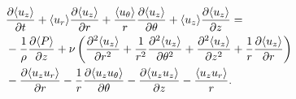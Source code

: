 \documentclass[oneside,a4paper,11pt]{report}
\begin{document}
\begin{align}
&\frac{\partial \langle u_z \rangle}{\partial t} + \langle u_r \rangle \frac{\partial \langle u_z \rangle}{\partial r} + \frac{\langle u_\theta \rangle}{r} \frac{\partial \langle u_z \rangle}{\partial \theta} + \langle u_z \rangle \frac{\partial \langle u_z \rangle}{\partial z} =  \nonumber \\
&-\frac{1}{\rho} \frac{\partial \langle P \rangle}{\partial z} + \nu \left ( \frac{\partial^2 \langle u_z \rangle}{\partial r^2} + \frac{1}{r^2} \frac{\partial^2 \langle u_z \rangle}{\partial \theta^2} + \frac{\partial^2 \langle u_z \rangle}{\partial z^2} + \frac{1}{r} \frac{\partial \langle u_z \rangle}{\partial r} \right ) \nonumber \\
&- \frac{\partial \langle u_z u_r \rangle}{\partial r} - \frac{1}{r} \frac{\partial \langle u_z u_\theta \rangle}{\partial \theta} - \frac{\partial \langle u_z u_z \rangle}{\partial z} - \frac{\langle u_z u_r \rangle}{r}.
\end{align}
 


\end{document}
